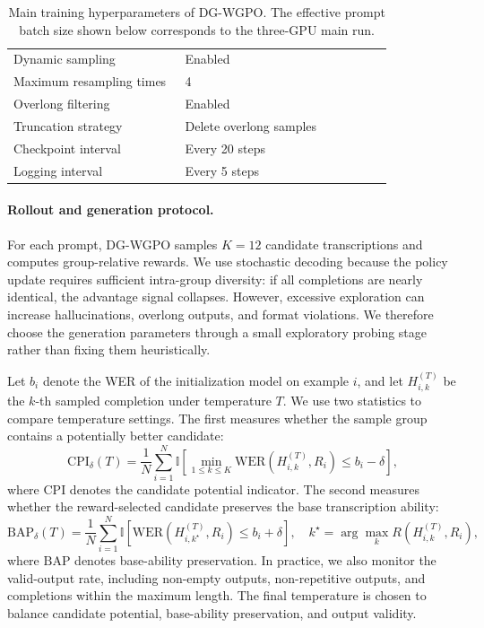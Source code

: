 \documentclass{llmxive}
\begin{document}
\begin{table}[t]
\begin{tabular}{p{0.38\linewidth} p{0.46\linewidth}}
Dynamic sampling
& Enabled \\

Maximum resampling times
& 4 \\

Overlong filtering
& Enabled \\

Truncation strategy
& Delete overlong samples \\

Checkpoint interval
& Every 20 steps \\

Logging interval
& Every 5 steps \\
\bottomrule
\end{tabular}
\vspace{-2mm}
\caption{
Main training hyperparameters of DG-WGPO. The effective prompt batch size shown
below corresponds to the three-GPU main run.
}
\label{tab:dg_wgpo_train_hparams}
\end{table}

\paragraph{Rollout and generation protocol.}
For each prompt, DG-WGPO samples $K=12$ candidate transcriptions and computes
group-relative rewards. We use stochastic decoding because the policy update
requires sufficient intra-group diversity: if all completions are nearly
identical, the advantage signal collapses. However, excessive exploration can
increase hallucinations, overlong outputs, and format violations. We therefore
choose the generation parameters through a small exploratory probing stage rather
than fixing them heuristically.

Let $b_i$ denote the WER of the initialization model on example $i$, and let
$H_{i,k}^{(T)}$ be the $k$-th sampled completion under temperature $T$. We use two
statistics to compare temperature settings. The first measures whether the sample
group contains a potentially better candidate:
\begin{equation}
\mathrm{CPI}_{\delta}(T)
=
\frac{1}{N}
\sum_{i=1}^{N}
\mathbb{I}
\left[
\min_{1 \leq k \leq K}
\mathrm{WER}\!\left(H_{i,k}^{(T)}, R_i\right)
\leq b_i - \delta
\right],
\end{equation}
where $\mathrm{CPI}$ denotes the candidate potential indicator. The second
measures whether the reward-selected candidate preserves the base transcription
ability:
\begin{equation}
\mathrm{BAP}_{\delta}(T)
=
\frac{1}{N}
\sum_{i=1}^{N}
\mathbb{I}
\left[
\mathrm{WER}\!\left(H_{i,k^\star}^{(T)}, R_i\right)
\leq b_i + \delta
\right],
\quad
k^\star = \arg\max_{k} R\!\left(H_{i,k}^{(T)}, R_i\right),
\end{equation}
where $\mathrm{BAP}$ denotes base-ability preservation. In practice, we also
monitor the valid-output rate, including non-empty outputs, non-repetitive
outputs, and completions within the maximum length. The final temperature is
chosen to balance candidate potential, base-ability preservation, and output
validity.
\end{document}
